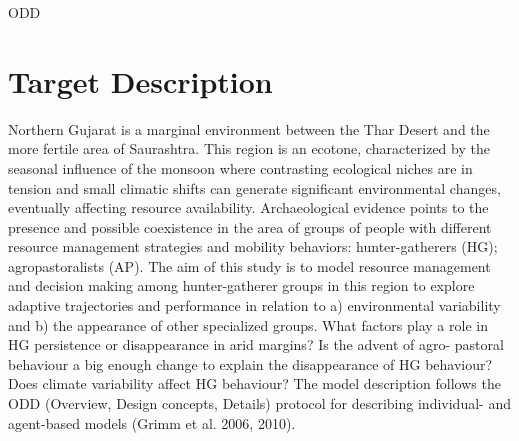 \documentclass[11pt,oneside,a4paper,openright]{report}
\begin{document}
ODD \cite{GrimmBergerODD2012}


	


	
	

\section{Target Description}

Northern Gujarat is a marginal environment between the Thar Desert and the more fertile area of
Saurashtra. This region is an ecotone, characterized by the seasonal influence of the monsoon where
contrasting ecological niches are in tension and small climatic shifts can generate significant
environmental changes, eventually affecting resource availability. Archaeological evidence points to
the presence and possible coexistence in the area of groups of people with different resource
management strategies and mobility behaviors: hunter-gatherers (HG); agropastoralists (AP).
The aim of this study is to model resource management and decision making among hunter-gatherer
groups in this region to explore adaptive trajectories and performance in relation to a) environmental
variability and b) the appearance of other specialized groups.
What factors play a role in HG persistence or disappearance in arid margins? Is the advent of agro-
pastoral behaviour a big enough change to explain the disappearance of HG behaviour? Does climate
variability affect HG behaviour?
The model description follows the ODD (Overview, Design concepts, Details) protocol for describing
individual- and agent-based models (Grimm et al. 2006, 2010).
\end{document}
